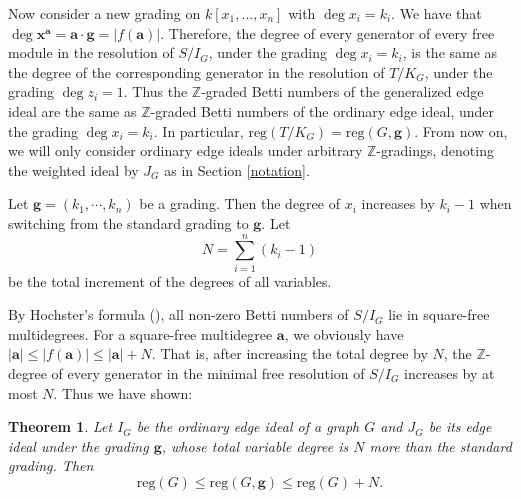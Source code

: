 \documentclass[dvipsnames,10pt]{article}
\newtheorem{theorem}{Theorem}[section]
\begin{document}
Now consider a new grading on $k[x_1,\dots,x_n]$ with $\deg x_i=k_i$. We have that $\deg \mathbf{x}^\mathbf{a}=\mathbf{a}\cdot \mathbf{g}=|f(\mathbf{a})|.$ Therefore, the degree of every generator of every free module in the resolution of $S/I_G$, under the grading $\deg x_i=k_i$, is the same as the degree of the corresponding generator in the resolution of $T/K_G$, under the grading $\deg z_i=1$. Thus the $\mathbb{Z}$-graded Betti numbers of the generalized edge ideal are the same as $\mathbb{Z}$-graded Betti numbers of the ordinary edge ideal, under the grading $\deg x_i=k_i$. In particular, $\mathrm{reg}(T/K_G)=\mathrm{reg}(G,\mathbf{g})$. From now on, we will only consider ordinary edge ideals under arbitrary $\mathbb{Z}$-gradings, denoting the weighted ideal by $J_G$ as in Section \ref{notation}.

Let $\mathbf{g}=(k_1,\cdots,k_n)$ be a grading. Then the degree of $x_i$ increases by $k_i-1$ when switching from the standard grading to $\mathbf{g}$. Let
\begin{equation*}
    N=\sum_{i=1}^n(k_i-1)
\end{equation*}
be the total increment of the degrees of all variables.

By Hochster's formula (), all non-zero Betti numbers of $S/I_G$ lie in square-free multidegrees. For a square-free multidegree $\mathbf{a}$, we obviously have $|\mathbf{a}|\leqslant|f(\mathbf{a})| \leqslant |\mathbf{a}| + N$. That is, after increasing the total degree by $N$, the $\mathbb{Z}$-degree of every generator in the minimal free resolution of $S/I_G$ increases by at most $N$. Thus we have shown:

\begin{theorem}
    Let $I_G$ be the ordinary edge ideal of a graph $G$ and $J_G$ be its edge ideal under the grading $\mathbf{g}$, whose total variable degree is $N$ more than the standard grading. Then
    \begin{equation*}
        \mathrm{reg}(G) \leqslant \mathrm{reg}(G,\mathbf{g}) \leqslant \mathrm{reg}(G)+N.
    \end{equation*}
\end{theorem}
\end{document}

